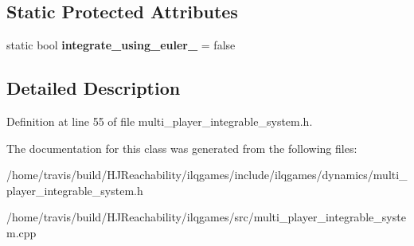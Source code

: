 \subsection*{Static Protected Attributes}
\begin{DoxyCompactItemize}
\item 
static bool {\bfseries integrate\+\_\+using\+\_\+euler\+\_\+} = false\hypertarget{classilqgames_1_1_multi_player_integrable_system_a45d12b2d86a80f04fac29bd88eb8179a}{}\label{classilqgames_1_1_multi_player_integrable_system_a45d12b2d86a80f04fac29bd88eb8179a}

\end{DoxyCompactItemize}


\subsection{Detailed Description}


Definition at line 55 of file multi\+\_\+player\+\_\+integrable\+\_\+system.\+h.



The documentation for this class was generated from the following files\+:\begin{DoxyCompactItemize}
\item 
/home/travis/build/\+H\+J\+Reachability/ilqgames/include/ilqgames/dynamics/multi\+\_\+player\+\_\+integrable\+\_\+system.\+h\item 
/home/travis/build/\+H\+J\+Reachability/ilqgames/src/multi\+\_\+player\+\_\+integrable\+\_\+system.\+cpp\end{DoxyCompactItemize}
